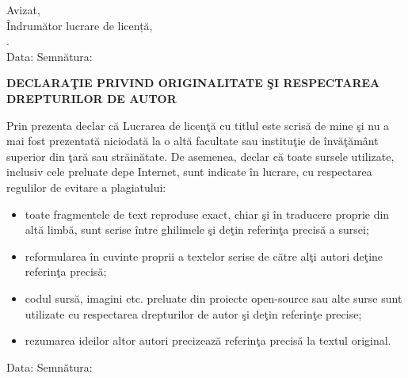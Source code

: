 \vspace*{\fill}

\begin{flushright}
    Avizat, \\
    Îndrumător lucrare de licență, \\
    \coordinator. \\
    Data: \dottedline \hspace{1cm} Semnătura: \dottedline
\end{flushright}

\vspace{1cm}
\begin{center}
    \large
    \textbf{DECLARAŢIE PRIVIND ORIGINALITATE ŞI RESPECTAREA DREPTURILOR DE AUTOR}
\end{center}

Prin  prezenta  declar  că  Lucrarea  de  licenţă  cu  titlul  \textbf{\thesistitle} 
este scrisă de  mine  şi  nu a  mai  fost prezentată niciodată  la o altă  facultate sau instituţie de învăţământ superior din ţară sau străinătate. De asemenea, declar că 
toate sursele utilizate, inclusiv  cele preluate depe Internet, sunt indicate în lucrare, cu respectarea regulilor de evitare a plagiatului: 

\begin{itemize}
    \item toate fragmentele de text 
reproduse exact, chiar şi în traducere proprie din altă limbă, sunt scrise între ghilimele şi deţin referinţa precisă a sursei;
    \item reformularea în cuvinte proprii a textelor 
scrise de către alţi autori deţine referinţa precisă;
    \item codul sursă, imagini etc. preluate din proiecte  open-source sau alte surse sunt utilizate cu respectarea drepturilor 
de autor şi deţin referinţe precise;  
    \item rezumarea ideilor altor autori precizează referinţa precisă la textul original.
\end{itemize}

\begin{flushright}
    Data: \dottedline \hspace{6cm} Semnătura: \dottedline
\end{flushright}

\vspace*{\fill}
\pagebreak